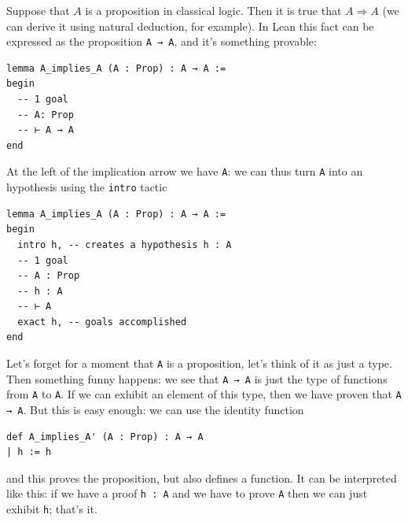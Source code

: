 \documentclass{book}
\theoremstyle{definition}
\theoremstyle{remark}
\theoremstyle{plain}
\begin{document}
Suppose that $A$ is a proposition in classical logic.
Then it is true that $A \Rightarrow A$ (we can derive it using natural deduction, for example).
In Lean this fact can be expressed as the proposition \lstinline{A → A}, and it's something provable:
\begin{lstlisting}
lemma A_implies_A (A : Prop) : A → A :=
begin
  -- 1 goal
  -- A: Prop
  -- ⊢ A → A
end
\end{lstlisting}
At the left of the implication arrow we have \lstinline{A}:
we can thus turn \lstinline{A} into an hypothesis using the \lstinline{intro} tactic
\begin{lstlisting}
lemma A_implies_A (A : Prop) : A → A :=
begin
  intro h, -- creates a hypothesis h : A
  -- 1 goal
  -- A : Prop
  -- h : A
  -- ⊢ A
  exact h, -- goals accomplished
end
\end{lstlisting}
Let's forget for a moment that \lstinline{A} is a proposition, let's think of it as just a type.
Then something funny happens: we see that \lstinline{A → A} is just the type of functions from \lstinline{A} to \lstinline{A}.
If we can exhibit an element of this type, then we have proven that \lstinline{A → A}.
But this is easy enough: we can use the identity function
\begin{lstlisting}
def A_implies_A' (A : Prop) : A → A
| h := h    
\end{lstlisting}
and this proves the proposition, but also defines a function.
It can be interpreted like this:
if we have a proof \lstinline{h : A} and we have to prove \lstinline{A} then we can just exhibit \lstinline{h}; that's it.
\end{document}
